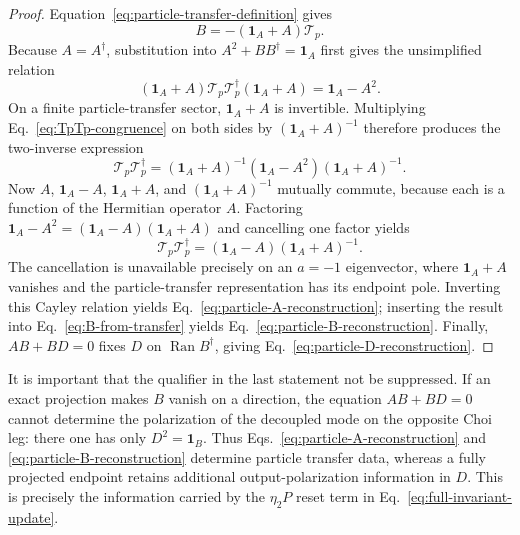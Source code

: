 \documentclass[aps,prb,onecolumn,nofootinbib,superscriptaddress]{revtex4-2}
\newcommand{\I}{\mathbf{1}}
\newcommand{\Ran}{\operatorname{Ran}}
\theoremstyle{plain}
\theoremstyle{definition}
\begin{document}
\begin{proof}
Equation~\eqref{eq:particle-transfer-definition} gives
\begin{equation}
  B=-(\I_A+A)\mathcal T_p.
  \label{eq:B-from-transfer}
\end{equation}
Because \(A=A^\dagger\), substitution into
\(A^2+BB^\dagger=\I_A\) first gives the unsimplified relation
\begin{equation}
  (\I_A+A)\mathcal T_p\mathcal T_p^\dagger(\I_A+A)
  =
  \I_A-A^2 .
  \label{eq:TpTp-congruence}
\end{equation}
On a finite particle-transfer sector, \(\I_A+A\) is invertible.  Multiplying
Eq.~\eqref{eq:TpTp-congruence} on both sides by
\((\I_A+A)^{-1}\) therefore produces the two-inverse expression
\begin{equation}
  \mathcal T_p\mathcal T_p^\dagger
  =
  (\I_A+A)^{-1}
  (\I_A-A^2)
  (\I_A+A)^{-1}.
  \label{eq:TpTp-two-inverses}
\end{equation}
Now \(A\), \(\I_A-A\), \(\I_A+A\), and
\((\I_A+A)^{-1}\) mutually commute, because each is a function of the
Hermitian operator \(A\).  Factoring
\(
  \I_A-A^2=(\I_A-A)(\I_A+A)
\)
and cancelling one factor yields
\begin{equation}
  \mathcal T_p\mathcal T_p^\dagger
  =
  (\I_A-A)(\I_A+A)^{-1}.
  \label{eq:TpTp-from-A}
\end{equation}
The cancellation is unavailable precisely on an \(a=-1\) eigenvector,
where \(\I_A+A\) vanishes and the particle-transfer representation has its
endpoint pole.
Inverting this Cayley relation yields
Eq.~\eqref{eq:particle-A-reconstruction}; inserting the result into
Eq.~\eqref{eq:B-from-transfer} yields
Eq.~\eqref{eq:particle-B-reconstruction}.  Finally, \(AB+BD=0\) fixes
\(D\) on \(\Ran B^\dagger\), giving
Eq.~\eqref{eq:particle-D-reconstruction}.
\end{proof}

It is important that the qualifier in the last statement not be suppressed.
If an exact projection makes \(B\) vanish on a direction, the equation
\(AB+BD=0\) cannot determine the polarization of the decoupled mode on the
opposite Choi leg: there one has only \(D^2=\I_B\).  Thus
Eqs.~\eqref{eq:particle-A-reconstruction} and
\eqref{eq:particle-B-reconstruction} determine particle transfer data,
whereas a fully projected endpoint retains additional output-polarization
information in \(D\).  This is precisely the information carried by the
\(\eta_2P\) reset term in Eq.~\eqref{eq:full-invariant-update}.
\end{document}
